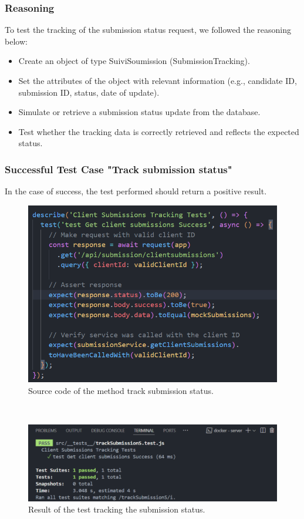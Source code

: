\subsubsection{Reasoning}
To test the tracking of the submission status request, we followed the reasoning below:
\begin{itemize}
    \item Create an object of type SuiviSoumission (SubmissionTracking).
    \item Set the attributes of the object with relevant information (e.g., candidate ID, submission ID, status, date of update).
    \item Simulate or retrieve a submission status update from the database.
    \item Test whether the tracking data is correctly retrieved and reflects the expected status.
\end{itemize}
\subsubsection{Successful Test Case "Track submission status"} 
In the case of success, the test performed should return a positive result.
\begin{figure}[h!]
    \centering
    \includegraphics[width=1\textwidth]{figures/track subS code.png} 
    \caption{Source code of the method track submission status.}
\end{figure} \
\begin{figure}[h!]
    \centering
    \includegraphics[width=1\textwidth]{figures/result tracksubS.png}  
    \caption{Result of the test tracking the submission status.}
\end{figure} \
\clearpage
